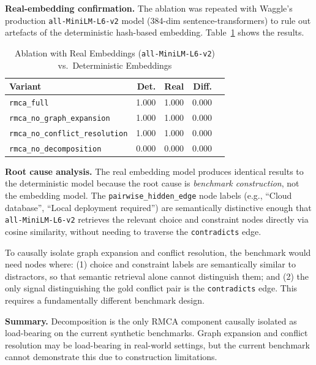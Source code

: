 \documentclass[conference]{IEEEtran}
\begin{document}
\textbf{Real-embedding confirmation.} The ablation was repeated with Waggle's production
\texttt{all-MiniLM-L6-v2} model (384-dim sentence-transformers) to rule out artefacts of
the deterministic hash-based embedding. Table~\ref{tab:ablation_real} shows the results.

\begin{table}[htbp]
\caption{Ablation with Real Embeddings (\texttt{all-MiniLM-L6-v2})\\
vs.\ Deterministic Embeddings}
\label{tab:ablation_real}
\centering
\begin{tabular}{lrrrr}
\toprule
\textbf{Variant} & \textbf{Det.} & \textbf{Real} & \textbf{Diff.} \\
\midrule
\texttt{rmca\_full}               & 1.000 & 1.000 & 0.000 \\
\texttt{rmca\_no\_graph\_expansion} & 1.000 & 1.000 & 0.000 \\
\texttt{rmca\_no\_conflict\_resolution} & 1.000 & 1.000 & 0.000 \\
\texttt{rmca\_no\_decomposition}  & 0.000 & 0.000 & 0.000 \\
\bottomrule
\end{tabular}
\end{table}

\textbf{Root cause analysis.} The real embedding model produces identical results to the
deterministic model because the root cause is \emph{benchmark construction}, not the
embedding model. The \texttt{pairwise\_hidden\_edge} node labels (e.g., ``Cloud database'',
``Local deployment required'') are semantically distinctive enough that
\texttt{all-MiniLM-L6-v2} retrieves the relevant choice and constraint nodes directly via
cosine similarity, without needing to traverse the \texttt{contradicts} edge.

To causally isolate graph expansion and conflict resolution, the benchmark would need nodes
where: (1) choice and constraint labels are semantically similar to distractors, so that
semantic retrieval alone cannot distinguish them; and (2) the only signal distinguishing the
gold conflict pair is the \texttt{contradicts} edge. This requires a fundamentally different
benchmark design.

\textbf{Summary.} Decomposition is the only RMCA component causally isolated as
load-bearing on the current synthetic benchmarks. Graph expansion and conflict resolution
may be load-bearing in real-world settings, but the current benchmark cannot demonstrate
this due to construction limitations.
\end{document}

